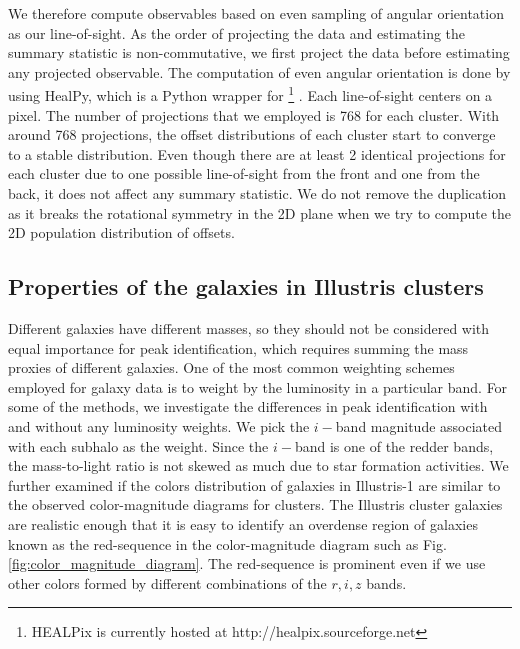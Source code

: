 We therefore compute observables based on even sampling of angular orientation 
as our line-of-sight.
As the order of projecting the data and estimating the summary statistic is
non-commutative, we first project the data before estimating any projected 
observable. 
The computation of even angular orientation 
is done by using {\sc HealPy}, which is a {\sc Python} wrapper for
{} \footnote{HEALPix is
currently hosted at http://healpix.sourceforge.net}
\citep{Gorski2005}. Each line-of-sight centers on a {} 
pixel.
The number of projections that we employed is 768 for each cluster. With around 
768 projections, the offset distributions of each cluster start to converge to a
stable distribution. 
Even though there are at least 2 identical projections for each cluster due to
one possible line-of-sight from the front and one from the back, it does not
affect any summary statistic. We do not remove the duplication as it breaks
the rotational symmetry in the 2D plane when we try to compute the 2D population
distribution of offsets.  


\subsection{Properties of the galaxies in Illustris clusters}
\label{subsec:galaxy_properties}

Different galaxies have different masses, so they should not be considered with equal
importance for peak identification, which requires summing
the mass proxies of different galaxies. One of the most common weighting schemes employed for galaxy data is to weight
by the luminosity in a particular band. For some of the methods, we investigate
the differences in peak identification with and without any luminosity weights.
We pick the $i-$band magnitude
associated with each subhalo as the weight. Since the $i-$band is
one of the redder bands, the mass-to-light ratio is not skewed as much due to star
formation activities. 
We further examined if the colors distribution of galaxies in Illustris-1 are
similar to the observed color-magnitude diagrams for clusters.
The Illustris cluster galaxies are realistic enough that it is easy to
identify an overdense region of galaxies known as the red-sequence in the 
color-magnitude diagram such as Fig.
\ref{fig:color_magnitude_diagram}. The red-sequence is prominent even if we
use other colors formed by different combinations of the $r, i, z$ bands.

